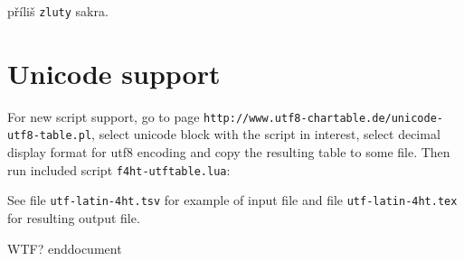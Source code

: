 \documentclass{article}
\begin{document}
	příliš \verb|zluty| sakra.

	
	\section{Unicode support}

	For new script support, go to page 
	\verb|http://www.utf8-chartable.de/unicode-utf8-table.pl|, 
	select unicode block with the script in interest, 
	select decimal display format for utf8 encoding and copy 
	the resulting table to some file. 
	Then run included script \verb|f4ht-utftable.lua|:


See file \verb|utf-latin-4ht.tsv| for example of input file and 
file \verb|utf-latin-4ht.tex| for resulting output file.

WTF?
end{document}
\end{document}
